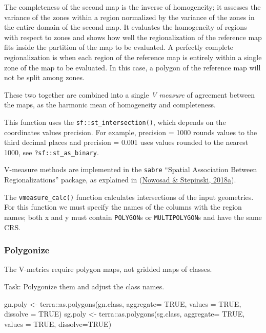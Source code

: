 \documentclass[
  letterpaper,
  DIV=11,
  numbers=noendperiod]{scrartcl}
\newenvironment{Shaded}{\begin{snugshade}}{\end{snugshade}}
\newcommand{\AttributeTok}[1]{\textcolor[rgb]{0.40,0.45,0.13}{#1}}
\newcommand{\ConstantTok}[1]{\textcolor[rgb]{0.56,0.35,0.01}{#1}}
\newcommand{\FunctionTok}[1]{\textcolor[rgb]{0.28,0.35,0.67}{#1}}
\newcommand{\NormalTok}[1]{\textcolor[rgb]{0.00,0.23,0.31}{#1}}
\newcommand{\OtherTok}[1]{\textcolor[rgb]{0.00,0.23,0.31}{#1}}
\newcommand{\SpecialCharTok}[1]{\textcolor[rgb]{0.37,0.37,0.37}{#1}}
\begin{document}
The completeness of the second map is the inverse of homogeneity; it
assesses the variance of the zones within a region normalized by the
variance of the zones in the entire domain of the second map. It
evaluates the homogeneity of regions with respect to zones and shows how
well the regionalization of the reference map fits inside the partition
of the map to be evaluated. A perfectly complete regionalization is when
each region of the reference map is entirely within a single zone of the
map to be evaluated. In this case, a polygon of the reference map will
not be split among zones.

These two together are combined into a single \emph{V measure} of
agreement between the maps, as the harmonic mean of homogeneity and
completeness.

This function uses the \texttt{sf::st\_intersection()}, which depends on
the coordinates values precision. For example, precision = 1000 rounds
values to the third decimal places and precision = 0.001 uses values
rounded to the nearest 1000, see \texttt{?sf::st\_as\_binary}.

V-measure methods are implemented in the \texttt{sabre} ``Spatial
Association Between Regionalizations'' package, as explained in
(\protect\hyperlink{ref-nowosadSpatialAssociationRegionalizations2018}{Nowosad
\& Stepinski, 2018a}).

The \texttt{vmeasure\_calc()} function calculates intersections of the
input geometries. For this function we must specify the names of the
columns with the region names; both x and y must contain
\texttt{POLYGON}s or \texttt{MULTIPOLYGON}s and have the same CRS.

\hypertarget{polygonize}{%
\subsubsection{Polygonize}\label{polygonize}}

The V-metrics require polygon maps, not gridded maps of classes.

Task: Polygonize them and adjust the class names.

\begin{Shaded}
\begin{Highlighting}[]
\NormalTok{gn.poly }\OtherTok{\textless{}{-}}\NormalTok{ terra}\SpecialCharTok{::}\FunctionTok{as.polygons}\NormalTok{(gn.class,}
                              \AttributeTok{aggregate=} \ConstantTok{TRUE}\NormalTok{,}
                              \AttributeTok{values =} \ConstantTok{TRUE}\NormalTok{,}
                              \AttributeTok{dissolve =} \ConstantTok{TRUE}\NormalTok{)}
\NormalTok{sg.poly }\OtherTok{\textless{}{-}}\NormalTok{ terra}\SpecialCharTok{::}\FunctionTok{as.polygons}\NormalTok{(sg.class,}
                              \AttributeTok{aggregate=} \ConstantTok{TRUE}\NormalTok{,}
                              \AttributeTok{values =} \ConstantTok{TRUE}\NormalTok{, }
                              \AttributeTok{dissolve=}\ConstantTok{TRUE}\NormalTok{)}
\end{Highlighting}
\end{Shaded}
\end{document}
